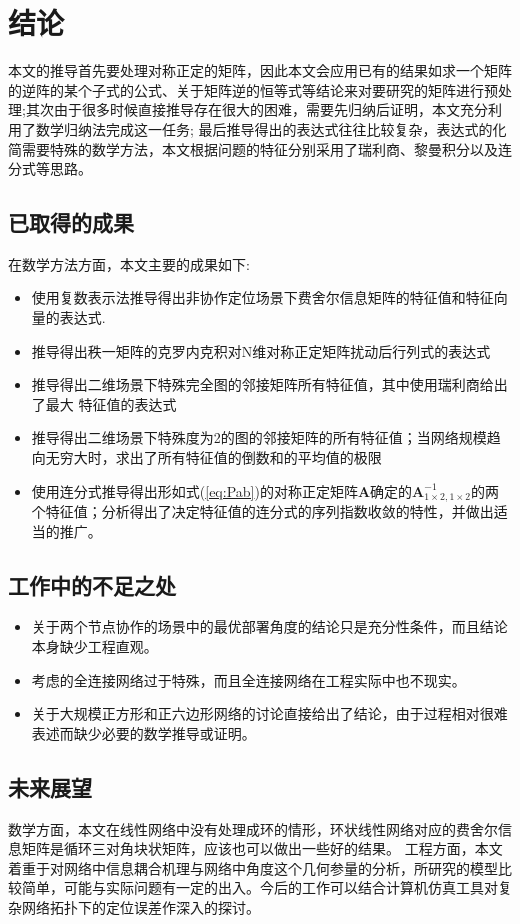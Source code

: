 \chapter{结论}\label{cha:content5}
    本文的推导首先要处理对称正定的矩阵，因此本文会应用已有的结果如求一个矩阵的逆阵的某个子式的公式、关于矩阵逆的恒等式等结论来对要研究的矩阵进行预处理;其次由于很多时候直接推导存在很大的困难，需要先归纳后证明，本文充分利用了数学归纳法完成这一任务;
    最后推导得出的表达式往往比较复杂，表达式的化简需要特殊的数学方法，本文根据问题的特征分别采用了瑞利商、黎曼积分以及连分式等思路。
  \section{已取得的成果}
  在数学方法方面，本文主要的成果如下:
  \begin{itemize}
  \item
    使用复数表示法推导得出非协作定位场景下费舍尔信息矩阵的特征值和特征向量的表达式.
  \item
    推导得出秩一矩阵的克罗内克积对N维对称正定矩阵扰动后行列式的表达式
  \item
    推导得出二维场景下特殊完全图的邻接矩阵所有特征值，其中使用瑞利商给出了最大 特征值的表达式
  \item 推导得出二维场景下特殊度为2的图的邻接矩阵的所有特征值；当网络规模趋向无穷大时，求出了所有特征值的倒数和的平均值的极限
  \item 使用连分式推导得出形如式(\ref{eq:Pab})的对称正定矩阵$\bm{A}$确定的$\bm{A}^{-1}_{1\times2,1\times2}$的两个特征值；分析得出了决定特征值的连分式的序列指数收敛的特性，并做出适当的推广。
  \end{itemize}
  \section{工作中的不足之处}
  \begin{itemize}
  \item
  关于两个节点协作的场景中的最优部署角度的结论只是充分性条件，而且结论本身缺少工程直观。
  \item
  考虑的全连接网络过于特殊，而且全连接网络在工程实际中也不现实。
  \item
  关于大规模正方形和正六边形网络的讨论直接给出了结论，由于过程相对很难表述而缺少必要的数学推导或证明。
  \end{itemize}
  \section{未来展望}
  
  数学方面，本文在线性网络中没有处理成环的情形，环状线性网络对应的费舍尔信息矩阵是循环三对角块状矩阵，应该也可以做出一些好的结果。
  工程方面，本文着重于对网络中信息耦合机理与网络中角度这个几何参量的分析，所研究的模型比较简单，可能与实际问题有一定的出入。今后的工作可以结合计算机仿真工具对复杂网络拓扑下的定位误差作深入的探讨。

